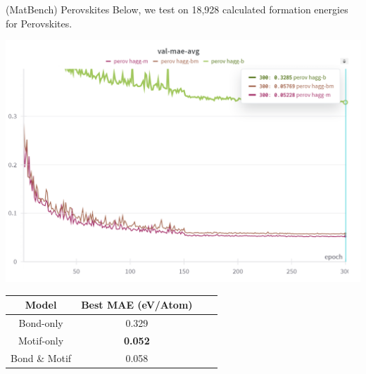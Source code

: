 \documentclass[11pt]{beamer}
\begin{document}
\begin{frame}{(MatBench) Perovskites}\small
Below, we test on 18,928 calculated formation energies for Perovskites.
\begin{center}
\includegraphics[scale=0.4]{perovskites.png}

\medskip


\begin{tabular}{c|ccc}
Model & Best MAE (eV/Atom) \\
\hline
Bond-only & 0.329\\
Motif-only & \textbf{ 0.052}\\
Bond \& Motif & 0.058\\
\end{tabular}
\end{center}
\end{frame}
\end{document}
